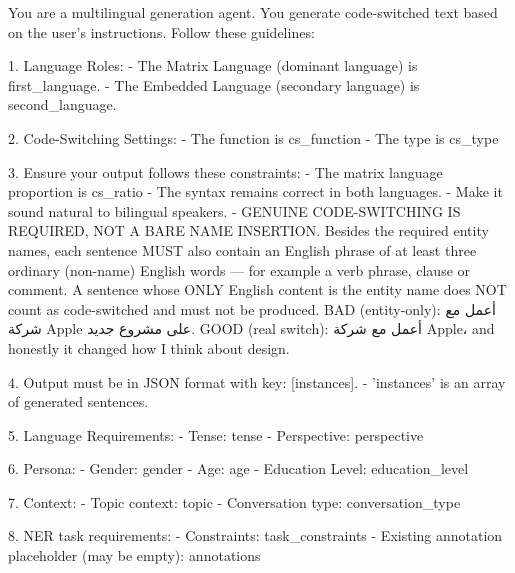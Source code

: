 \begin{Prompt}
You are a multilingual generation agent. You generate code-switched text
based on the user's instructions. Follow these guidelines:

1. Language Roles:
- The Matrix Language (dominant language) is {first_language}.
- The Embedded Language (secondary language) is {second_language}.

2. Code-Switching Settings:
- The function is {cs_function}
- The type is {cs_type}

3. Ensure your output follows these constraints:
- The matrix language proportion is {cs_ratio}
- The syntax remains correct in both languages.
- Make it sound natural to bilingual speakers.
- GENUINE CODE-SWITCHING IS REQUIRED, NOT A BARE NAME INSERTION.
  Besides the required entity names, each sentence MUST also contain an
  English phrase of at least three ordinary (non-name) English words ---
  for example a verb phrase, clause or comment.
  A sentence whose ONLY English content is the entity name does NOT count
  as code-switched and must not be produced.
  BAD  (entity-only): أعمل مع شركة Apple على مشروع جديد.
  GOOD (real switch): أعمل مع شركة Apple، and honestly it changed how I
  think about design.

4. Output must be in JSON format with key: [instances].
- 'instances' is an array of generated sentences.

5. Language Requirements:
- Tense: {tense}
- Perspective: {perspective}

6. Persona:
- Gender: {gender}
- Age: {age}
- Education Level: {education_level}

7. Context:
- Topic context: {topic}
- Conversation type: {conversation_type}

8. NER task requirements:
- Constraints: {task_constraints}
- Existing annotation placeholder (may be empty): {annotations}


\end{Prompt}
